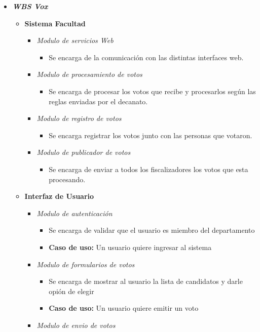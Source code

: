 \begin{itemize}
 \item {\bf \emph{WBS Vox}}
\begin{itemize}
 \item {\bf Sistema Facultad}
\begin{itemize}
 \item \emph{Modulo de servicios Web} 
\begin{itemize}
 \item Se encarga de la comunicación con las distintas interfaces web.
\end{itemize}
 \item \emph{Modulo de procesamiento de votos} 
\begin{itemize}
 \item Se encarga de procesar los votos que recibe y procesarlos según las reglas enviadas por el decanato.
\end{itemize}
 \item \emph{Modulo de registro de votos} 
\begin{itemize}
 \item Se encarga registrar los votos junto con las personas que votaron.
\end{itemize}
 \item \emph{Modulo de publicador de votos} 
\begin{itemize}
 \item Se encarga de enviar a todos los fiscalizadores los votos que esta procesando.
\end{itemize}
\end{itemize}
 \item {\bf Interfaz de Usuario}
\begin{itemize}
 \item \emph{Modulo de autenticación}
\begin{itemize}
 \item Se encarga de validar que el usuario es miembro del departamento
 \item {\bf Caso de uso:} Un usuario quiere ingresar al sistema
\end{itemize}
 \item \emph{Modulo de formularios de votos}
\begin{itemize}
 \item Se encarga de mostrar al usuario la lista de candidatos y darle opión de elegir
 \item {\bf Caso de uso:} Un usuario quiere emitir un voto
\end{itemize}
 \item \emph{Modulo de envio de votos}

\end{itemize}
\end{itemize}
\end{itemize}
